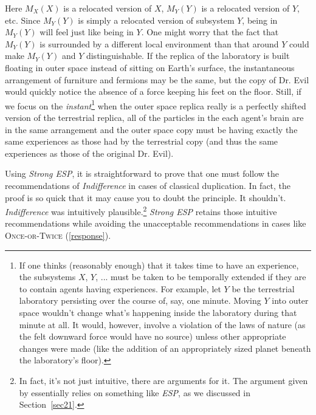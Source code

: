 \documentclass[onecolumn,secnumarabic,amsmath,amssymb,balancelastpage,nofootinbib]{article}
\begin{document}
Here $M_X(X)$ is a {relocated} version of $X$, $M_Y(Y)$ is a {relocated} version of $Y$, etc.  Since $M_Y(Y)$ is simply a {relocated} version of subsystem $Y$, being in $M_Y(Y)$ will feel just like being in $Y$.  One might worry that the fact that $M_Y(Y)$ is surrounded by a different local environment than that around $Y$ could make $M_Y(Y)$ and $Y$ distinguishable.  If the replica of the laboratory is built floating in outer space instead of sitting on Earth's surface, the instantaneous arrangement of furniture and fermions may be the same, but the copy of Dr. Evil would quickly notice the absence of a force keeping his feet on the floor.  Still, if we focus on the \emph{instant}\footnote{If one thinks (reasonably enough) that it takes time to have an experience, the subsystems $X$, $Y$, ... must be taken to be temporally extended if they are to contain agents having experiences.  For example, let $Y$ be the terrestrial laboratory persisting over the course of, say, one minute.  {Moving} $Y$ into outer space wouldn't change what's happening inside the laboratory during that minute at all. It would, however, involve a violation of the laws of nature (as the felt downward force would have no source) unless other appropriate changes were made (like the addition of an appropriately sized planet beneath the laboratory's floor).\label{temporalextension}} when the outer space replica really is a perfectly shifted version of the terrestrial replica, all of the particles in the each agent's brain are in the same arrangement and the outer space copy must be having exactly the same experiences as those had by the terrestrial copy (and thus the same experiences as those of the original Dr. Evil).

Using \emph{Strong ESP}, it is straightforward to prove that one must follow the recommendations of \emph{Indifference} in cases of classical duplication.  In fact, the proof is so quick that it may cause you to doubt the principle.  It shouldn't.  \emph{Indifference} was intuitively plausible.\footnote{In fact, it's not just intuitive, there are arguments for it.  The argument given by \citet{elga2004} essentially relies on something like \emph{ESP}, as we discussed in Section~\ref{sec21}.}  \emph{Strong ESP} retains those intuitive recommendations while avoiding the unacceptable recommendations in cases like \textsc{Once-or-Twice} (\textsection \ref{response}).
\end{document}
